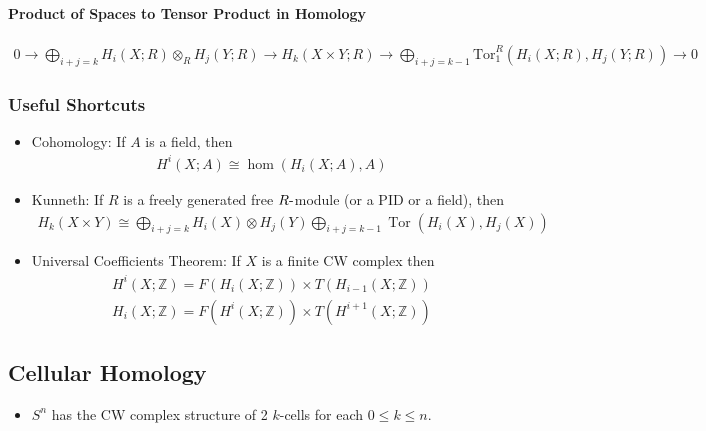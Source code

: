 \hypertarget{product-of-spaces-to-tensor-product-in-homology}{%
\paragraph{Product of Spaces to Tensor Product in
Homology}\label{product-of-spaces-to-tensor-product-in-homology}}

\begin{align*}
0\to \bigoplus _{{i+j=k}}H_{i}(X;R)\otimes _{R}H_{j}(Y;R)\to H_{k}(X\times Y;R)\to \bigoplus _{{i+j=k-1}}{\mathrm  {Tor}}_{1}^{R}(H_{i}(X;R),H_{j}(Y;R))\to 0
\end{align*}

\hypertarget{useful-shortcuts}{%
\subsubsection{Useful Shortcuts}\label{useful-shortcuts}}

\begin{itemize}
\item
  Cohomology: If \(A\) is a field, then
  \begin{align*}H^i(X; A) \cong \hom(H_i(X; A), A)\end{align*}
\item
  Kunneth: If \(R\) is a freely generated free \(R{\hbox{-}}\)module (or
  a PID or a field), then
  \begin{align*} 
  H_{k}(X\times Y) \cong \bigoplus _{{i+j=k}}H_{i}(X)\otimes H_{j}(Y) \bigoplus_{i+j=k-1}\operatorname{Tor}(H_i(X), H_j(X))
  \end{align*}
\item
  Universal Coefficients Theorem: If \(X\) is a finite CW complex then
  \begin{align*}
  H^i(X; {\mathbb{Z}}) = F(H_i(X; {\mathbb{Z}})) \times T(H_{i-1}(X; {\mathbb{Z}}))\\
  H_i(X; {\mathbb{Z}}) = F(H^i(X; {\mathbb{Z}})) \times T(H^{i+1}(X; {\mathbb{Z}}))
  \end{align*}
\end{itemize}

\hypertarget{cellular-homology}{%
\subsection{Cellular Homology}\label{cellular-homology}}

\begin{itemize}
\tightlist
\item
  \(S^n\) has the CW complex structure of 2 \(k\)-cells for each
  \(0\leq k \leq n\).
\end{itemize}

